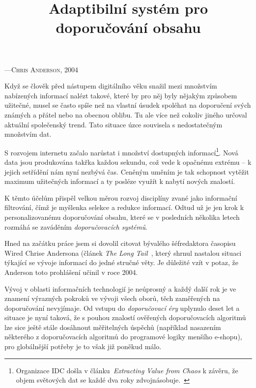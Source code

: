 \documentclass[thesis=M,czech]{FITthesis}[2014/05/07]
\title{Adaptibilní systém pro doporučování obsahu}
\begin{document}

\begin{introduction}
\begin{epigraphs}
%
 {---\textsc{Chris Anderson, 2004~\cite{anderson}}}
 \end{epigraphs}	
	Když se člověk před nástupem digitálního věku snažil mezi množstvím nabízených informací nalézt takové, které by pro něj byly nějakým způsobem užitečné, musel se často spíše než na vlastní úsudek spoléhat na doporučení svých známých a přátel nebo na obecnou oblibu. Tu ale více než cokoliv jiného určoval aktuální společenský trend. Tato situace úzce souvisela s nedostatečným množstvím dat.

	S rozvojem internetu začalo narůstat i množství dostupných informací\footnote{Organizace IDC došla v článku~\emph{Extracting Value from Chaos} k závěru, že objem světových dat se každé dva roky zdvojnásobuje.~\cite{digitaluniverse}}. Nová data jsou produkována takřka každou sekundu, což vede k opačnému extrému – k jejich setřídění nám nyní nezbývá čas. Ceněným uměním je tak schopnost vytěžit maximum užitečných informací a ty posléze využít k nabytí nových znalostí.
	
	K těmto účelům přispěl velkou měrou rozvoj disciplíny zvané jako informační filtrování, čímž je myšlenka selekce a redukce informací. Odtud už je jen krok k personalizovanému doporučování obsahu, které se v posledních několika letech rozmáhá se zaváděním \emph{doporučovacích systémů}. 

	Hned na začátku práce jsem si dovolil citovat bývalého šéfredaktora časopisu Wired Chrise Andersona (článek \emph{The Long Tail~\cite{anderson}}, který shrnul nastalou situaci týkající se vývoje informací do jedné stručné věty. Je důležité vzít v potaz, že Anderson toto prohlášení učinil v roce 2004. 
	
	Vývoj v oblasti informačních technologií je neúprosný a každý další rok je ve znamení výrazných pokroků ve vývoji všech oborů, těch zaměřených na doporučování nevyjímaje. Od vstupu do \emph{doporučovací éry} uplynulo deset let a situace je nyní taková, že s pouhou znalostí ověřených doporučovacích algoritmů lze sice ještě stále dosáhnout měřitelných úspěchů (například nasazením některého z doporučovacích algoritmů do programové logiky menšího e-shopu), pro globálnější potřeby je to však již poněkud málo.
	

\end{introduction}
\end{document}
